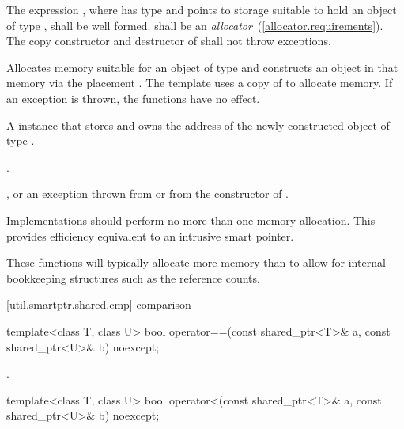 \begin{itemdescr}
\pnum
\requires The expression ,
where  has type  and points to storage suitable
to hold an object of type , shall be well formed.  shall
be an \textit{allocator}~(\ref{allocator.requirements}). The copy constructor
and destructor of  shall not throw exceptions.

\pnum
\effects Allocates memory suitable for an object of type 
and constructs an object in that memory via the placement
.
The template  uses a copy of  to
allocate memory. If an exception is thrown, the functions have no effect.

\pnum
\returns A  instance that stores and owns
the address of the newly constructed object of type .

\pnum
\postconditions {}.

\pnum
\throws {}, or an exception thrown from
 or from the constructor of .

\pnum
\remarks Implementations should
perform no more than one memory allocation. \enternote This provides
efficiency equivalent to an intrusive smart pointer. \exitnote

\pnum
\enternote These functions will typically allocate more memory
than  to allow for internal bookkeeping structures such
as the reference counts. \exitnote
\end{itemdescr}

[util.smartptr.shared.cmp]{ comparison}

%
%
\begin{itemdecl}
template<class T, class U> bool operator==(const shared_ptr<T>& a, const shared_ptr<U>& b) noexcept;
\end{itemdecl}

\begin{itemdescr}
\pnum\returns  {}.
\end{itemdescr}

%
%
\begin{itemdecl}
template<class T, class U> bool operator<(const shared_ptr<T>& a, const shared_ptr<U>& b) noexcept;
\end{itemdecl}

